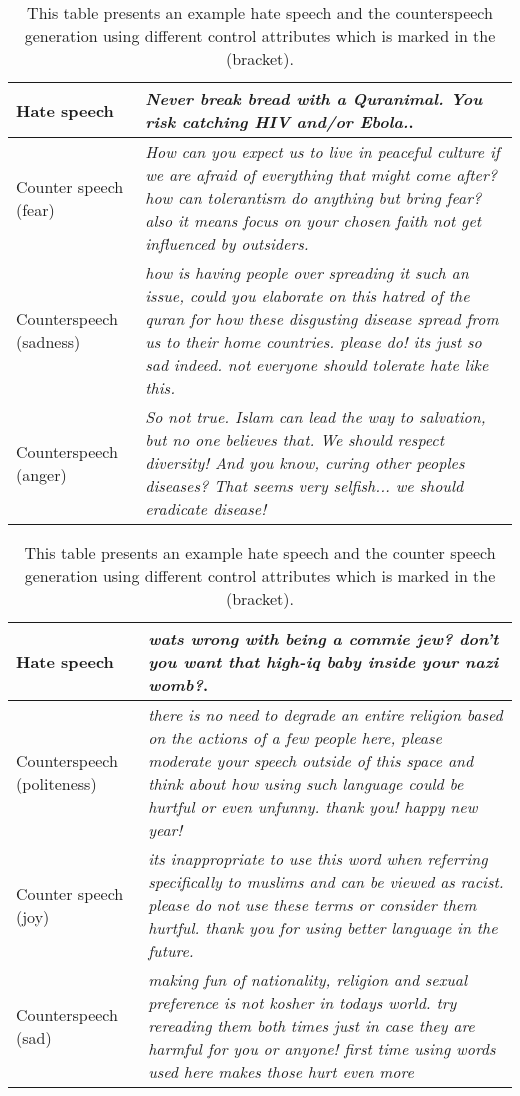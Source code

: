 \begin{table}[!htpb]
\centering
\footnotesize{
\begin{tabular}{p{3cm}p{12cm}}\hline
Hate speech              &  \textit{Never break bread with a Quranimal. You risk catching HIV and/or Ebola.}.\\\hline
Counter speech (fear)    &  \textit{How can you expect us to live in peaceful culture if we are afraid of everything that might come after? how can tolerantism do anything but bring fear? also it means focus on your chosen faith not get influenced by outsiders.}\\\hline
Counterspeech (sadness) &  \textit{how is having people over spreading it such an issue, could you elaborate on this hatred of the quran for how these disgusting disease spread from us to their home countries. please do! its just so sad indeed. not everyone should tolerate hate like this.}\\\hline
Counterspeech (anger) &  \textit{So not true. Islam can lead the way to salvation, but no one believes that. We should respect diversity! And you know, curing other peoples diseases? That seems very selfish... we should eradicate disease!}\\\hline

\end{tabular}}
\caption{\footnotesize{This table presents an example hate speech and the counterspeech generation using different control attributes which is marked in the (bracket).}}
\label{tab:table-example2}
\end{table}


\begin{table}[!htpb]
\centering
\footnotesize{
\begin{tabular}{p{3cm}p{12cm}}\hline
Hate speech              &  \textit{wats wrong with being a commie jew? don't you want that high-iq baby inside your nazi womb?}.\\\hline
Counterspeech (politeness)    &  \textit{there is no need to degrade an entire religion based on the actions of a few people here, please moderate your speech outside of this space and think about how using such language could be hurtful or even unfunny. thank you!  happy  new year!}\\\hline
Counter speech (joy) &  \textit{its inappropriate to use this word when referring specifically to muslims and can be viewed as racist. please do not use these terms or consider them hurtful. thank you for using better language in the future.}\\\hline
Counterspeech (sad) &  \textit{making fun of nationality, religion and sexual preference is not kosher in todays world. try rereading them both times just in case they are harmful for you or anyone! first time using words used here makes those hurt even more}\\\hline
\end{tabular}}
\caption{\footnotesize{This table presents an example hate speech and the counter speech generation using different control attributes which is marked in the (bracket).}}
\label{tab:table-example3}
\end{table}

